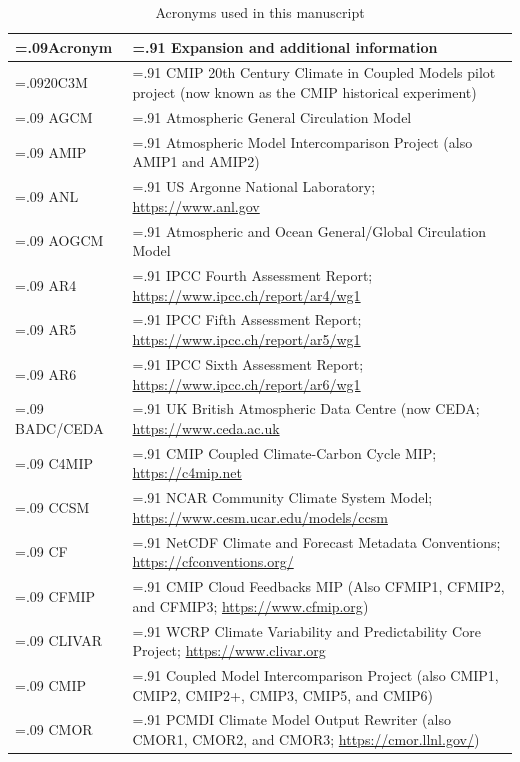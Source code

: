 \documentclass[gmd, preprint]{copernicus}
\begin{document}
\begin{table}[htp]
\renewcommand{\arraystretch}{2}
\scriptsize
\centering
\caption{Acronyms used in this manuscript}
\resizebox{\textwidth}{!} {
	\begin{tabularx}{1\textwidth} { 
	  | >{\raggedright\arraybackslash\hsize=.09\hsize}X
	  | >{\centering\arraybackslash\hsize=.91\hsize}X | }
\hline
\textbf{Acronym} & \textbf{Expansion and additional information}\\
\hline
20C3M & CMIP 20th Century Climate in Coupled Models pilot project (now known as the CMIP historical experiment) \\
\hline
AGCM & Atmospheric General Circulation Model \\
\hline
AMIP & Atmospheric Model Intercomparison Project (also AMIP1 and AMIP2) \\
\hline
ANL & US Argonne National Laboratory; \url{https://www.anl.gov} \\
\hline
AOGCM & Atmospheric and Ocean General/Global Circulation Model \\
\hline
AR4 & IPCC Fourth Assessment Report; \url{https://www.ipcc.ch/report/ar4/wg1} \\
\hline
AR5 & IPCC Fifth Assessment Report; \url{https://www.ipcc.ch/report/ar5/wg1}\\
\hline
AR6 & IPCC Sixth Assessment Report; \url{https://www.ipcc.ch/report/ar6/wg1} \\
\hline
BADC/CEDA & UK British Atmospheric Data Centre (now CEDA; \url{https://www.ceda.ac.uk} \\
\hline
C4MIP & CMIP Coupled Climate-Carbon Cycle MIP; \url{https://c4mip.net} \\
\hline
CCSM & NCAR Community Climate System Model; \url{https://www.cesm.ucar.edu/models/ccsm} \\
\hline
CF & NetCDF Climate and Forecast Metadata Conventions; \url{https://cfconventions.org/} \\
\hline
CFMIP & CMIP Cloud Feedbacks MIP (Also CFMIP1, CFMIP2, and CFMIP3; \url{https://www.cfmip.org}) \\
\hline
CLIVAR & WCRP Climate Variability and Predictability Core Project; \url{https://www.clivar.org} \\
\hline
CMIP & Coupled Model Intercomparison Project (also CMIP1, CMIP2, CMIP2+, CMIP3, CMIP5, and CMIP6) \\
\hline
CMOR & PCMDI Climate Model Output Rewriter (also CMOR1, CMOR2, and CMOR3; \url{https://cmor.llnl.gov/}) \\
\hline

\end{tabularx}}
\end{table}
\end{document}
